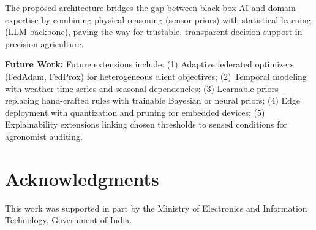 \documentclass[10pt,journal,compsoc]{IEEEtran}
\begin{document}
The proposed architecture bridges the gap between black-box AI and domain expertise by combining physical reasoning (sensor priors) with statistical learning (LLM backbone), paving the way for trustable, transparent decision support in precision agriculture.

\textbf{Future Work:} Future extensions include: (1) Adaptive federated optimizers (FedAdam, FedProx) for heterogeneous client objectives; (2) Temporal modeling with weather time series and seasonal dependencies; (3) Learnable priors replacing hand-crafted rules with trainable Bayesian or neural priors; (4) Edge deployment with quantization and pruning for embedded devices; (5) Explainability extensions linking chosen thresholds to sensed conditions for agronomist auditing.

\section*{Acknowledgments}
This work was supported in part by the Ministry of Electronics and Information Technology, Government of India.
\end{document}
